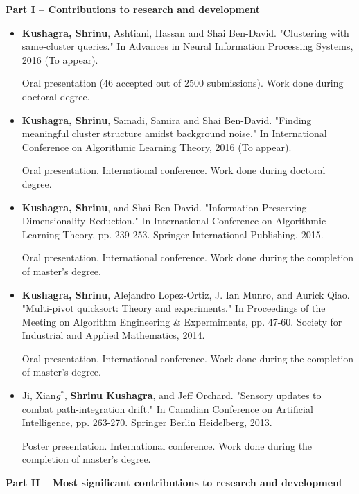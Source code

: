 \documentclass[12pt]{article}
\begin{document}
\linespread{0.901}

\noindent\textbf{Part I – Contributions to research and development}

\begin{itemize}[noitemsep]
\item  \textbf{Kushagra, Shrinu}, Ashtiani, Hassan and Shai Ben-David. "Clustering with same-cluster queries." In Advances in Neural Information Processing Systems, 2016 (To appear).

Oral presentation (46 accepted out of 2500 submissions). Work done during doctoral degree.

\item  \textbf{Kushagra, Shrinu}, Samadi, Samira and Shai Ben-David. "Finding meaningful cluster structure amidst background noise." In International Conference on Algorithmic Learning Theory, 2016 (To appear).

Oral presentation. International conference. Work done during doctoral degree.
 
\item \textbf{Kushagra, Shrinu}, and Shai Ben-David. "Information Preserving Dimensionality Reduction." In International Conference on Algorithmic Learning Theory, pp. 239-253. Springer International Publishing, 2015.

Oral presentation. International conference. Work done during the completion of master's degree.

\item \textbf{Kushagra, Shrinu}, Alejandro Lopez-Ortiz, J. Ian Munro, and Aurick Qiao. "Multi-pivot quicksort: Theory and experiments." In Proceedings of the Meeting on Algorithm Engineering \& Expermiments, pp. 47-60. Society for Industrial and Applied Mathematics, 2014.

Oral presentation. International conference. Work done during the completion of master's degree.

\item Ji, Xian$g^*$, \textbf{Shrinu Kushagra}, and Jeff Orchard. "Sensory updates to combat path-integration drift." In Canadian Conference on Artificial Intelligence, pp. 263-270. Springer Berlin Heidelberg, 2013.

Poster presentation. International conference. Work done during the completion of master's degree.
\end{itemize}

\noindent\textbf{Part II – Most significant contributions to research and development}
\end{document}
